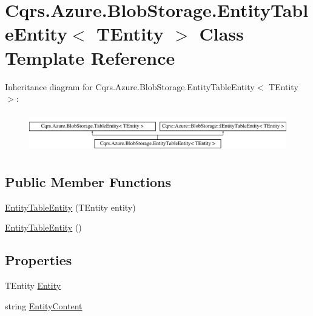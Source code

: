 \hypertarget{classCqrs_1_1Azure_1_1BlobStorage_1_1EntityTableEntity}{}\section{Cqrs.\+Azure.\+Blob\+Storage.\+Entity\+Table\+Entity$<$ T\+Entity $>$ Class Template Reference}
\label{classCqrs_1_1Azure_1_1BlobStorage_1_1EntityTableEntity}
Inheritance diagram for Cqrs.\+Azure.\+Blob\+Storage.\+Entity\+Table\+Entity$<$ T\+Entity $>$\+:\begin{figure}[H]
\begin{center}
\leavevmode
\includegraphics[height=1.723077cm]{classCqrs_1_1Azure_1_1BlobStorage_1_1EntityTableEntity}
\end{center}
\end{figure}
\subsection*{Public Member Functions}
\begin{DoxyCompactItemize}
\item 
\hyperlink{classCqrs_1_1Azure_1_1BlobStorage_1_1EntityTableEntity_a8d3f730147f5f9b37faeea0840db6a64}{Entity\+Table\+Entity} (T\+Entity entity)
\item 
\hyperlink{classCqrs_1_1Azure_1_1BlobStorage_1_1EntityTableEntity_a8a41f6e4ad55a23f9ea68e675ea52c9b}{Entity\+Table\+Entity} ()
\end{DoxyCompactItemize}
\subsection*{Properties}
\begin{DoxyCompactItemize}
\item 
T\+Entity \hyperlink{classCqrs_1_1Azure_1_1BlobStorage_1_1EntityTableEntity_ac1f795a5b8c45645ebc71bcde126bcb5}{Entity}
\item 
string \hyperlink{classCqrs_1_1Azure_1_1BlobStorage_1_1EntityTableEntity_ac6a2c9afc07bb6fae99c0906a408b5b6}{Entity\+Content}
\end{DoxyCompactItemize}
